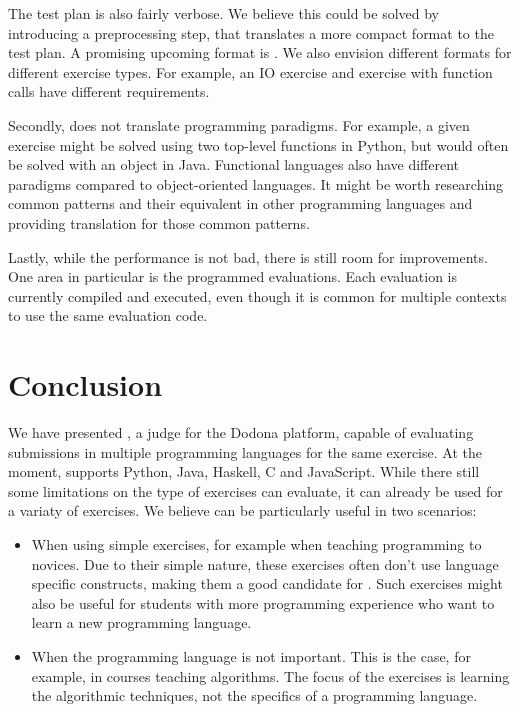 \documentclass[5p,number]{elsarticle}
\begin{document}
    The test plan is also fairly verbose.
    We believe this could be solved by introducing a preprocessing step, that translates a more compact format to the test plan.
    A promising upcoming format is \cite{peml}.
    We also envision different formats for different exercise types.
    For example, an IO exercise and exercise with function calls have different requirements.
    
    Secondly, \tested{} does not translate programming paradigms.
    For example, a given exercise might be solved using two top-level functions in Python, but would often be solved with an object in Java.
    Functional languages also have different paradigms compared to object-oriented languages.
    It might be worth researching common patterns and their equivalent in other programming languages and providing translation for those common patterns.
    
    Lastly, while the performance is not bad, there is still room for improvements.
    One area in particular is the programmed evaluations.
    Each evaluation is currently compiled and executed, even though it is common for multiple contexts to use the same evaluation code.
    
    \section{Conclusion}\label{sec:conclusion}
    
    We have presented \tested{}, a judge for the Dodona platform, capable of evaluating submissions in multiple programming languages for the same exercise.
    At the moment, \tested{} supports Python, Java, Haskell, C and JavaScript.
    While there still some limitations on the type of exercises \tested{} can evaluate, it can already be used for a variaty of exercises.
    We believe \tested{} can be particularly useful in two scenarios:
    
    \begin{itemize}
        \item When using simple exercises, for example when teaching programming to novices.
        Due to their simple nature, these exercises often don't use language specific constructs, making them a good candidate for \tested{}.
        Such exercises might also be useful for students with more programming experience who want to learn a new programming language.
        \item When the programming language is not important.
        This is the case, for example, in courses teaching algorithms.
        The focus of the exercises is learning the algorithmic techniques, not the specifics of a programming language.
    \end{itemize}
    

    
    
\end{document}
